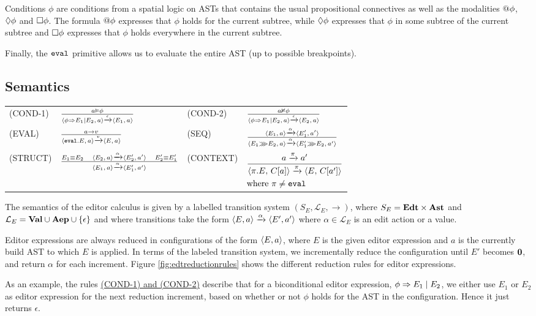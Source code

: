 Conditions $\phi$ are conditions from a spatial logic on ASTs that contains
the usual propositional connectives as well as the modalities
$@\phi$, $\Diamond \phi$ and $\Box \phi$. The formula
$@\phi$ expresses that $\phi$ holds for the current subtree, while
$\Diamond \phi$ expresses that $\phi$ in some subtree of the current
subtree and $\Box \phi$ expresses that $\phi$ holds
everywhere in the current subtree.

Finally, the $\texttt{eval}$ primitive allows us to evaluate the entire AST
(up to possible breakpoints).

\subsection{Semantics}

\begin{figure*}
  \center
  \renewcommand{\arraystretch}{2}
  \begin{tabular}{llll}
    \scriptsize(COND-1)  & $ \frac{a \vDash \phi} {\langle \phi \Rightarrow E_1 \mid E_2,\, a \rangle\xrightarrow[]{\text{$\epsilon$}}\langle E_1,\, a \rangle} $           & \scriptsize(COND-2) & $ \frac{a \nvDash \phi} {\langle \phi \Rightarrow E_1 \mid E_2,\, a \rangle\xrightarrow[]{\text{$\epsilon$}}\langle E_2,\, a \rangle}$ \\
    \scriptsize(EVAL)    & $ \frac{a \to v} {\langle \texttt{eval}.E,\, a \rangle\xrightarrow[]{\text{$v$}}\langle E,\, a \rangle} $              & \scriptsize(SEQ)    & $ \frac{\langle E_1,\, a \rangle\xrightarrow[]{\text{$\alpha$}}\langle E_1',\, a' \rangle} {\langle E_1 \ggg E_2,\, a \rangle\xrightarrow[]{\text{$\alpha$}}\langle E_1' \ggg E_2,\, a' \rangle}$     \\
    \scriptsize(STRUCT)  & $\frac{E_1 \equiv E_2\quad\langle E_2,\, a \rangle\xrightarrow[]{\text{$\alpha$}}\langle E_2',\, a' \rangle \quad E_2' \equiv E_1'} {\langle E_1,\, a \rangle\xrightarrow[]{\text{$\alpha$}}\langle E_1',\, a' \rangle}$              & \scriptsize(CONTEXT)& \scriptsize$\begin{aligned} & \frac{a \xrightarrow[]{\text{$\pi$}} a'} {\langle \pi.E,\, C[a] \rangle\xrightarrow[]{\text{$\pi$}}\langle E,\, C[a'] \rangle} \\ & \text{where } \pi \neq \texttt{eval} \end{aligned}$
  \end{tabular}
  \caption{Editor Expression reduction rules}
  \label{fig:edtreductionrules}
\end{figure*}

The semantics of the editor calculus is given by a labelled transition system
$(S_E, \mathcal{L}_E, \to)$, where $S_E = \textbf{Edt} \times \textbf{Ast}$ and $\mathcal{L}_E
= \textbf{Val} \cup \textbf{Aep} \cup \{\epsilon\}$ and where transitions take the form
$\langle E, a \rangle \xrightarrow[]{\text{$\alpha$}} \langle E', a' \rangle$ where
$\alpha \in \mathcal{L}_E$ is an edit action or a value.

Editor expressions are always reduced in configurations of the form
$\langle E,a \rangle$, where $E$ is the given editor expression and $a$ is the
currently build AST to which $E$ is applied. In terms of the labeled
transition system, we incrementally reduce the configuration until $E'$ becomes
$\mathbf{0}$, and return $\alpha$ for each increment. Figure
\ref{fig:edtreductionrules} shows the different reduction rules for editor
expressions.

As an example, the rules \hyperref[fig:edtreductionrules]{(COND-1) and (COND-2)} describe that
for a biconditional editor expression, $\phi \Rightarrow E_1 \mid E_2$, we either use
$E_1$ or $E_2$ as editor expression for the next reduction increment, based on
whether or not $\phi$ holds for the AST in the configuration. Hence it just
returns $\epsilon$.

